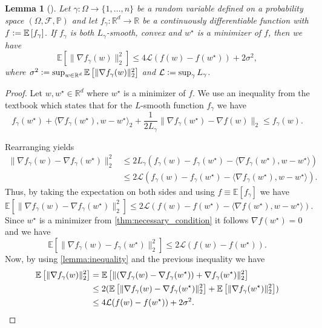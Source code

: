 \documentclass[12pt]{article}
\newtheorem{lemma}[lemma]{Lemma}
\theoremstyle{definition}
\numberwithin{equation}{section}
\newcommand{\R}{\mathbb{R}}
\newcommand{\BP}{\mathbb{P}}
\newcommand{\CF}{\mathcal{F}}
\newcommand{\CL}{\mathcal{L}}
\newcommand{\ev}[1]{\mathbb{E}\left[{#1}\right]}
\newcommand{\norm}[1]{\lVert{#1}\rVert_2}
\newcommand{\scp}[2]{\langle{#1}, {#2}\rangle_2}
\newcommand{\defeq}{\vcentcolon=}
\begin{document}
\begin{lemma}[]
  \label{lemma:gradient_inequality}
  Let $\gamma : \Omega \rightarrow \{1,\dots,n\}$ be a random variable defined on a probability space $(\Omega, \CF, \BP)$ and let $f_{\gamma} : \R^d \rightarrow \R$ be a continuously differentiable function with $f \defeq \ev{f_{\gamma}}$. If $f_{\gamma}$ is both $L_{\gamma}$-smooth, convex and $w^\star$ is a minimizer of $f$, then we have
  \begin{equation}
    \ev{\norm{\nabla f_{\gamma}(w)}^2} \leq 4 \CL (f(w) - f(w^\star)) + 2 \sigma^2,
  \end{equation}
  where $\sigma^2 \defeq \sup_{w \in \R^d} \ev{\norm{\nabla f_\gamma(w)}^2}$ and $\CL \defeq \sup_{\gamma} L_{\gamma}$.
\end{lemma}
\begin{proof}
  Let $w, w^\star \in \R^d$ where $w^\star$ is a minimizer of $f$. We use an inequality from the textbook \cite[pp.~67, (2.1.10)]{nesterovLecturesConvexOptimization2018} which states that for the $L$-smooth function $f_\gamma$ we have
  \begin{equation*}
    f_\gamma(w^\star) + \scp{\nabla f_\gamma(w^\star)}{w - w^\star} + \frac{1}{2 L_\gamma}\norm{\nabla f_\gamma(w^\star) - \nabla f(w)} \leq f_\gamma(w).
  \end{equation*}
  
  Rearranging yields
  \begin{align*}
    \norm{\nabla f_{\gamma}(w) - \nabla f_{\gamma}(w^\star)}^2 &\leq 2L_{\gamma}(f_{\gamma}(w) - f_{\gamma}(w^\star) - \langle \nabla f_{\gamma}(w^\star), w - w^\star \rangle) \\
    &\leq 2\CL(f_{\gamma}(w) - f_{\gamma}(w^\star) - \langle \nabla f_{\gamma}(w^\star), w - w^\star \rangle).
  \end{align*}
  Thus, by taking the expectation on both sides and using $f \equiv \ev{f_\gamma}$ we have
  \begin{equation*}
    \ev{\norm{\nabla f_{\gamma}(w) - \nabla f_{\gamma}(w^\star)}^2 } \leq 2\CL(f(w) - f(w^\star) - \langle \nabla f(w^\star), w - w^\star \rangle).
  \end{equation*}
  Since $w^\star$ is a minimizer from \autoref{thm:necessary_condition} it follows $\nabla f(w^\star) = 0$ and we have
  \begin{equation*}
    \ev{\norm{\nabla f_{\gamma}(w) - f_{\gamma}(w^\star)}^2 } \leq 2\CL(f(w) - f(w^\star)).
  \end{equation*}
  Now, by using \autoref{lemma:inequality} and the previous inequality we have
  \begin{align*}
    \ev{\norm{\nabla f_{\gamma}(w)}^2} &= \ev{\norm{(\nabla f_{\gamma}(w) - \nabla f_{\gamma}(w^\star)) + \nabla f_{\gamma}(w^\star)}^2} \\
    &\leq 2( \ev{\norm{\nabla f_{\gamma}(w) - \nabla f_{\gamma}(w^\star)}^2 } + \ev{\norm{\nabla f_{\gamma}(w^\star)}^2}) \\
    &\leq 4\CL(f(w) - f(w^\star)) + 2\sigma^2. \qedhere
  \end{align*}
\end{proof}
\end{document}
